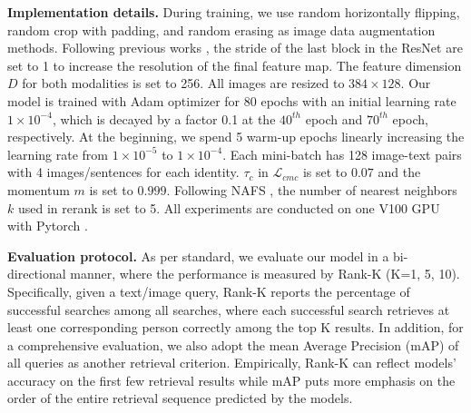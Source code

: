 \documentclass{bmvc2k}
\newcommand{\revision}[1]{#1}
\newcommand{\statement}[1]{\noindent\textbf{#1}}
\begin{document}
\statement{Implementation details.} During training, we use random horizontally flipping, random crop with padding, and random erasing \cite{luo2019strong} as image data augmentation methods. 
Following previous works \cite{gao2021contextual,zheng2020hierarchical,wang2020vitaa}, the stride of the last block in the ResNet are set to 1 to increase the resolution of the final feature map. 
The feature dimension $D$ for both modalities is set to 256.  
All images are resized to $384 \times 128$. 
Our model is trained with Adam optimizer \cite{kingma2014adam} for 80 epochs with an initial learning rate $1 \times 10^{-4}$, which is decayed by a factor 0.1 at the $40^{th}$ epoch and $70^{th}$ epoch, respectively. 
At the beginning, we spend 5 warm-up epochs linearly increasing the learning rate from $1 \times 10^{-5}$ to $1 \times 10^{-4}$. 
Each mini-batch has 128 image-text pairs with 4 images/sentences for each identity. 
$\tau_c$ in $\mathcal{L}_{cmc}$ is set to $0.07$ and the momentum $m$ is set to $0.999$. 
Following NAFS \cite{gao2021contextual}, the number of nearest neighbors $k$ used in rerank is set to 5.
All experiments are conducted on one V100 GPU with Pytorch \cite{paszke2019pytorch}. 

\statement{Evaluation protocol.} As per standard, we evaluate our model in a bi-directional manner, where the performance is measured by Rank-K (K=1, 5, 10). \revision{Specifically, given a text/image query, Rank-K reports the percentage of successful searches among all searches, where each successful search retrieves at least one corresponding person correctly among the top K results.}
In addition, for a comprehensive evaluation, we also adopt the mean Average Precision (mAP) of all queries \cite{zheng2020hierarchical,farooq2021axm,wang2021mgel} as another retrieval criterion. \revision{Empirically, Rank-K can reflect models' accuracy on the first few retrieval results while mAP puts more emphasis on the order of the entire retrieval sequence predicted by the models.}

\vspace*{-3mm}
\end{document}
